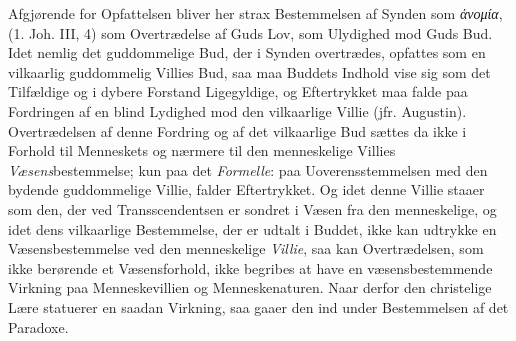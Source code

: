 Afgjørende for Opfattelsen bliver her strax Bestemmelsen af Synden som
\textit{ἀνομία}, (1. Joh. III, 4) som Overtrædelse af Guds Lov, som Ulydighed
mod Guds Bud. Idet nemlig det guddommelige Bud, der i Synden overtrædes,
opfattes som en vilkaarlig guddommelig Villies Bud, saa maa Buddets Indhold vise
sig som det Tilfældige og i dybere Forstand Ligegyldige, og Eftertrykket maa
falde paa Fordringen af en blind Lydighed mod den vilkaarlige Villie (jfr.
Augustin). Overtrædelsen af denne Fordring og af det vilkaarlige Bud sættes da
ikke i Forhold til Menneskets og nærmere til den menneskelige Villies
\emph{Væsens}bestemmelse; kun paa det \emph{Formelle}: paa Uoverensstemmelsen
med den bydende guddommelige Villie, falder Eftertrykket. Og idet denne Villie
staaer som den, der ved Transscendentsen er sondret i Væsen fra den
menneskelige, og idet dens vilkaarlige Bestemmelse, der er udtalt i Buddet, ikke
kan udtrykke en Væsensbestemmelse ved den menneskelige \emph{Villie}, saa kan
Overtrædelsen, som ikke berørende et Væsensforhold, ikke begribes at have en
væsensbestemmende Virkning paa Menneskevillien og Menneskenaturen. Naar derfor
den christelige Lære statuerer en saadan Virkning, saa gaaer den ind under
Bestemmelsen af det Paradoxe.

